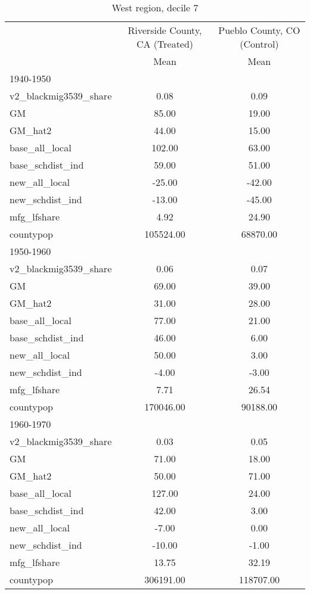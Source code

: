 \begin{table}[htbp]\centering
\def\sym#1{\ifmmode^{#1}\else\(^{#1}\)\fi}
\caption{West region, decile 7 \label{tab1}}
\begin{tabular}{l*{2}{c}}
\toprule
                    &\multicolumn{1}{c}{Riverside County, CA (Treated)}&\multicolumn{1}{c}{Pueblo County, CO (Control)}\\
                    &        Mean&        Mean\\
\midrule
1940-1950           &            &            \\
v2\_blackmig3539\_share&        0.08&        0.09\\
GM                  &       85.00&       19.00\\
GM\_hat2             &       44.00&       15.00\\
base\_all\_local      &      102.00&       63.00\\
base\_schdist\_ind    &       59.00&       51.00\\
new\_all\_local       &      -25.00&      -42.00\\
new\_schdist\_ind     &      -13.00&      -45.00\\
mfg\_lfshare         &        4.92&       24.90\\
countypop           &   105524.00&    68870.00\\
\midrule
1950-1960           &            &            \\
v2\_blackmig3539\_share&        0.06&        0.07\\
GM                  &       69.00&       39.00\\
GM\_hat2             &       31.00&       28.00\\
base\_all\_local      &       77.00&       21.00\\
base\_schdist\_ind    &       46.00&        6.00\\
new\_all\_local       &       50.00&        3.00\\
new\_schdist\_ind     &       -4.00&       -3.00\\
mfg\_lfshare         &        7.71&       26.54\\
countypop           &   170046.00&    90188.00\\
\midrule
1960-1970           &            &            \\
v2\_blackmig3539\_share&        0.03&        0.05\\
GM                  &       71.00&       18.00\\
GM\_hat2             &       50.00&       71.00\\
base\_all\_local      &      127.00&       24.00\\
base\_schdist\_ind    &       42.00&        3.00\\
new\_all\_local       &       -7.00&        0.00\\
new\_schdist\_ind     &      -10.00&       -1.00\\
mfg\_lfshare         &       13.75&       32.19\\
countypop           &   306191.00&   118707.00\\
\bottomrule
\end{tabular}
\end{table}
